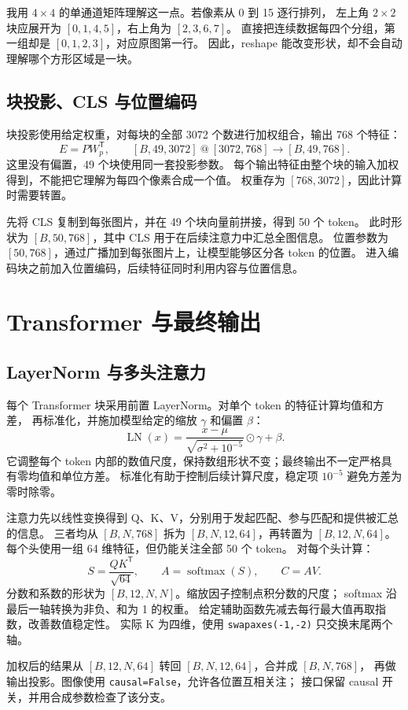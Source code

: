 \documentclass[a4paper,12pt]{article}
\begin{document}
我用 $4\times4$ 的单通道矩阵理解这一点。若像素从 0 到 15 逐行排列，
左上角 $2\times2$ 块应展开为 $[0,1,4,5]$，右上角为 $[2,3,6,7]$。
直接把连续数据每四个分组，第一组却是 $[0,1,2,3]$，对应原图第一行。
因此，reshape 能改变形状，却不会自动理解哪个方形区域是一块。

\subsection{块投影、CLS 与位置编码}
块投影使用给定权重，对每块的全部 3072 个数进行加权组合，输出 768 个特征：
\[
E=P W_p^{\mathsf T},\qquad
[B,49,3072]\ @\ [3072,768]\longrightarrow[B,49,768].
\]
这里没有偏置，49 个块使用同一套投影参数。
每个输出特征由整个块的输入加权得到，不能把它理解为每四个像素合成一个值。
权重存为 $[768,3072]$，因此计算时需要转置。

先将 CLS 复制到每张图片，并在 49 个块向量前拼接，得到 50 个 token。
此时形状为 $[B,50,768]$，其中 CLS 用于在后续注意力中汇总全图信息。
位置参数为 $[50,768]$，通过广播加到每张图片上，让模型能够区分各 token 的位置。
进入编码块之前加入位置编码，后续特征同时利用内容与位置信息。

\clearpage
\section{Transformer 与最终输出}
\subsection{LayerNorm 与多头注意力}
每个 Transformer 块采用前置 LayerNorm。对单个 token 的特征计算均值和方差，
再标准化，并施加模型给定的缩放 $\gamma$ 和偏置 $\beta$：
\[
\operatorname{LN}(x)=\frac{x-\mu}{\sqrt{\sigma^2+10^{-5}}}\odot\gamma+\beta.
\]
它调整每个 token 内部的数值尺度，保持数组形状不变；最终输出不一定严格具有零均值和单位方差。
标准化有助于控制后续计算尺度，稳定项 $10^{-5}$ 避免方差为零时除零。

注意力先以线性变换得到 Q、K、V，分别用于发起匹配、参与匹配和提供被汇总的信息。
三者均从 $[B,N,768]$ 拆为 $[B,N,12,64]$，再转置为 $[B,12,N,64]$。
每个头使用一组 64 维特征，但仍能关注全部 50 个 token。
对每个头计算：
\[
S=\frac{QK^{\mathsf T}}{\sqrt{64}},\qquad
A=\operatorname{softmax}(S),\qquad C=AV.
\]
分数和系数的形状为 $[B,12,N,N]$。缩放因子控制点积分数的尺度；
softmax 沿最后一轴转换为非负、和为 1 的权重。
给定辅助函数先减去每行最大值再取指数，改善数值稳定性。
实际 K 为四维，使用 \texttt{swapaxes(-1,-2)} 只交换末尾两个轴。

加权后的结果从 $[B,12,N,64]$ 转回 $[B,N,12,64]$，合并成 $[B,N,768]$，
再做输出投影。图像使用 \texttt{causal=False}，允许各位置互相关注；
接口保留 causal 开关，并用合成参数检查了该分支。
\end{document}
